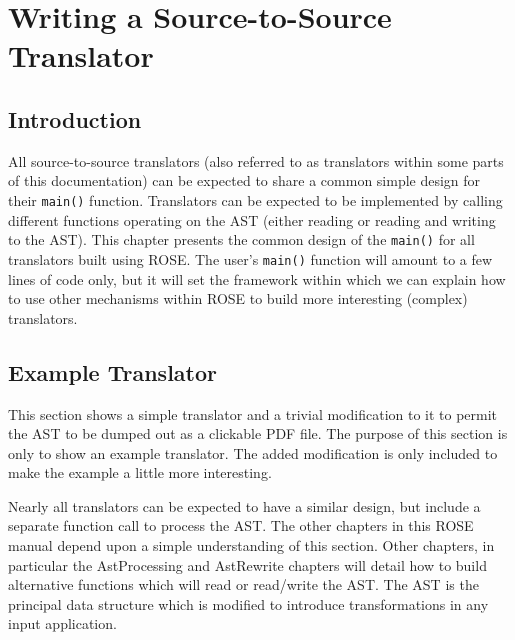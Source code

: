 \chapter{Writing a Source-to-Source Translator}

\label{translatorDesign:translatorDesign}


\section{Introduction}

   All source-to-source translators (also referred to as translators within some parts of
this documentation) can be expected to share a common simple design for their {\tt main()}
function.  Translators can be expected to be implemented by calling different
functions operating on the AST (either reading or reading and writing to the AST).
This chapter presents the common design of the {\tt main()} for all translators
built using ROSE.  The user's {\tt main()} function will amount to a few lines 
of code only, but it will set the framework within which we can explain how to use 
other mechanisms within ROSE to build more interesting (complex) translators.

\section{Example Translator}

   This section shows a simple translator and a trivial modification to it
to permit the AST to be dumped out as a clickable PDF file. The purpose
of this section is only to show an example translator. The added modification is
only included to make the example a little more interesting.

   Nearly all translators can be expected to have a similar design, but include a
separate function call to process the AST. The other chapters in this ROSE manual
depend upon a simple understanding of this section.  Other chapters, in particular
the AstProcessing and AstRewrite chapters will detail how to build alternative
functions which will read or read/write the AST.  The AST is the principal
data structure which is modified to introduce transformations in any input application.


